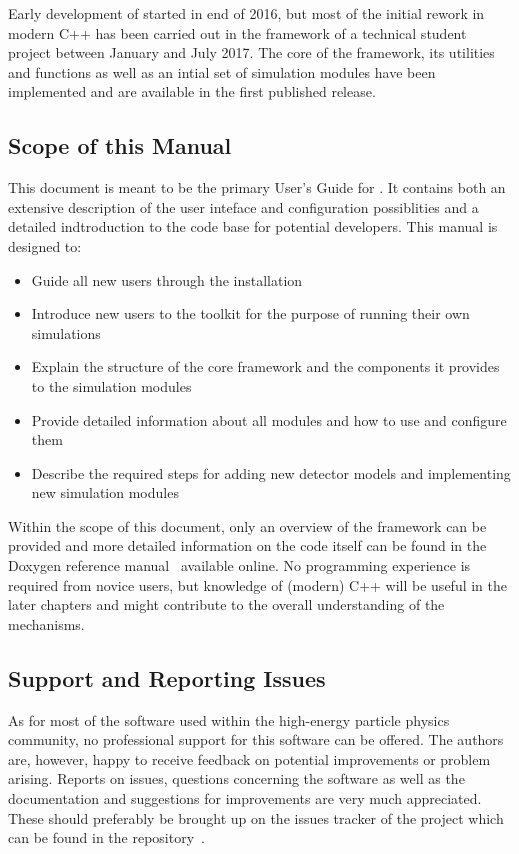 Early development of \apsq started in end of 2016, but most of the initial rework in modern C++ has been carried out in the framework of a technical student project between January and July 2017.
The core of the framework, its utilities and functions as well as an intial set of simulation modules have been implemented and are available in the first published release.

\subsection{Scope of this Manual}
This document is meant to be the primary User's Guide for \apsq.
It contains both an extensive description of the user inteface and configuration possiblities and a detailed indtroduction to the code base for potential developers.
This manual is designed to:
\begin{itemize}
\item Guide all new users through the installation 
\item Introduce new users to the toolkit for the purpose of running their own simulations
\item Explain the structure of the core framework and the components it provides to the simulation modules
\item Provide detailed information about all modules and how to use and configure them
\item Describe the required steps for adding new detector models and implementing new simulation modules
\end{itemize}

Within the scope of this document, only an overview of the framework can be provided and more detailed information on the code itself can be found in the Doxygen reference manual~\cite{doxygen} available online.
No programming experience is required from novice users, but knowledge of (modern) C++ will be useful in the later chapters and might contribute to the overall understanding of the mechanisms.

\subsection{Support and Reporting Issues}
As for most of the software used within the high-energy particle physics community, no professional support for this software can be offered.
The authors are, however, happy to receive feedback on potential improvements or problem arising.
Reports on issues, questions concerning the software as well as the documentation and suggestions for improvements are very much appreciated.
These should preferably be brought up on the issues tracker of the project which can be found in the repository~\cite{ap2-issue-tracker}.
